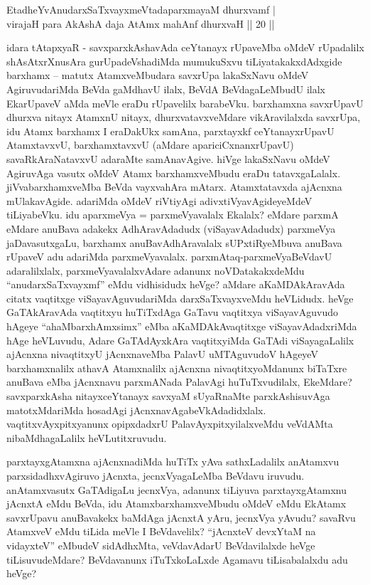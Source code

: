 \begin{shl}
EtadheYvAnudarxSaTxvayxmeVtadaparxmayaM dhurxvamf |\\
virajaH para AkAshA daja AtAmx mahAnf dhurxvaH || 20 ||
\end{shl}

\begin{artha}
idara tAtapxyaR - savxparxkAshavAda ceYtanayx rUpaveMba oMdeV rUpadalilx shAsAtxrXnusAra gurUpadeVshadiMda mumukuSxvu tiLiyatakakxdAdxgide barxhamx {\rm --} matutx AtamxveMbudara savxrUpa lakaSxNavu oMdeV AgiruvudariMda BeVda gaMdhavU ilalx, BeVdA BeVdagaLeMbudU ilalx EkarUpaveV aMda meVle eraDu rUpavelilx barabeVku. barxhamxna savxrUpavU dhurxva nitayx AtamxnU nitayx, dhurxvatavxveMdare vikAravilalxda savxrUpa, idu Atamx barxhamx I eraDakUkx samAna, parxtayxkf ceYtanayxrUpavU AtamxtavxvU, barxhamxtavxvU (aMdare apariciCxnanxrUpavU) savaRkAraNatavxvU adaraMte samAnavAgive. hiVge lakaSxNavu oMdeV AgiruvAga vasutx oMdeV Atamx barxhamxveMbudu eraDu tatavxgaLalalx. jiVvabarxhamxveMba BeVda vayxvahAra mAtarx. Atamxtatavxda ajAcnxna mUlakavAgide. adariMda oMdeV riVtiyAgi adivxtiVyavAgideyeMdeV tiLiyabeVku. idu aparxmeVya = parxmeVyavalalx Ekalalx? eMdare parxmA eMdare anuBava adakekx AdhAravAdadudx (viSayavAdadudx) parxmeVya jaDavasutxgaLu, barxhamx anuBavAdhAravalalx sUPxtiRyeMbuva anuBava rUpaveV adu adariMda parxmeVyavalalx. parxmAtaq-parxmeVyaBeVdavU adaralilxlalx, parxmeVyavalalxvAdare adanunx noVDatakakxdeMdu ``anudarxSaTxvayxmf'' eMdu vidhisidudx heVge? aMdare aKaMDAkAravAda citatx vaqtitxge viSayavAguvudariMda darxSaTxvayxveMdu heVLidudx. heVge GaTAkAravAda vaqtitxyu huTiTxdAga GaTavu vaqtitxya viSayavAguvudo hAgeye ``ahaMbarxhAmxsimx'' eMba aKaMDAkAvaqtitxge viSayavAdadxriMda hAge heVLuvudu, Adare GaTAdAyxkAra vaqtitxyiMda GaTAdi viSayagaLalilx ajAcnxna nivaqtitxyU jAcnxnaveMba PalavU uMTAguvudoV hAgeyeV barxhamxnalilx athavA Atamxnalilx ajAcnxna nivaqtitxyoMdanunx biTaTxre anuBava eMba jAcnxnavu parxmANada PalavAgi huTuTxvudilalx, EkeMdare? savxparxkAsha nitayxceYtanayx savxyaM sUyaRnaMte parxkAshisuvAga matotxMdariMda hosadAgi jAcnxnavAgabeVkAdadidxlalx. vaqtitxvAyxpitxyanunx opipxdadxrU PalavAyxpitxyilalxveMdu veVdAMta nibaMdhagaLalilx heVLutitxruvudu.

parxtayxgAtamxna ajAcnxnadiMda huTiTx yAva sathxLadalilx anAtamxvu parxsidadhxvAgiruvo jAcnxta, jecnxVyagaLeMba BeVdavu iruvudu. anAtamxvasutx GaTAdigaLu jecnxVya, adanunx tiLiyuva parxtayxgAtamxnu jAcnxtA eMdu BeVda, idu AtamxbarxhamxveMbudu oMdeV eMdu EkAtamx savxrUpavu anuBavakekx baMdAga jAcnxtA yAru, jecnxVya yAvudu?  savaRvu AtamxveV eMdu tiLida meVle I BeVdavelilx? ``jAcnxteV devxYtaM na vidayxteV'' eMbudeV sidAdhxMta, veVdavAdarU BeVdavilalxde heVge tiLisuvudeMdare? BeVdavanunx iTuTxkoLaLxde Agamavu tiLisabalalxdu adu heVge? 
\end{artha}

